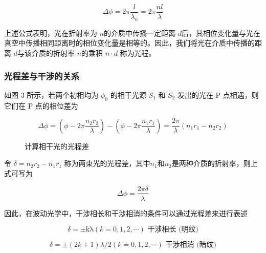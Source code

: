 \documentclass{ctexart}
\begin{document}
\[\Delta\phi = 2\pi\frac{l}{\lambda_{n}} = 2\pi\frac{nl}{\lambda}\]


上述公式表明，光在折射率为 $n$的介质中传播一定距离 $d$后，其相位变化量与光在真空中传播相同距离时的相位变化量是相等的。因此，我们将光在介质中传播的距离 $d$与该介质的折射率 $n$的乘积 $n\cdot d$ 称为光程。

\subsubsection{光程差与干涉的关系}

如图 3 所示，若两个初相均为 $\phi_0$ 的相干光源 $S_1$ 和 $S_2$ 发出的光在 P 点相遇，则它们在 P 点的相位差为

\[\Delta\phi = \left( \phi - 2\pi\frac{n_{2}r_{2}}{\lambda} \right) - \left( \phi - 2\pi\frac{n_{1}r_{1}}{\lambda} \right) = \frac{2\pi}{\lambda}\left( n_{1}r_{1} - n_{2}r_{2} \right)\]

\begin{figure}[ht]
    \centering
    \fbox{\rule{2cm}{0pt} \rule{0pt}{2cm}} %
    \caption{计算相干光的光程差}
    \label{fig:3}
\end{figure}
令 $\delta = n_2 r_2 - n_1 r_1$ 称为两束光的光程差，其中$n_1$和$n_2$是两种介质的折射率，则上式可写为


\[\Delta\phi = \frac{2 \pi\delta }{\lambda}\]


因此，在波动光学中，干涉相长和干涉相消的条件可以通过光程差来进行表述

\[\delta = \pm \text{kλ}(k = 0,1,2,\cdots)\text{~}\text{干涉相长}\text{\ (}\text{明纹}\text{)}\]

\[\delta = \pm (2k + 1)\lambda/2(k = 0,1,2,\cdots)\text{~}\text{干涉相消}\text{\ (}\text{暗纹}\text{)}\]
\end{document}
